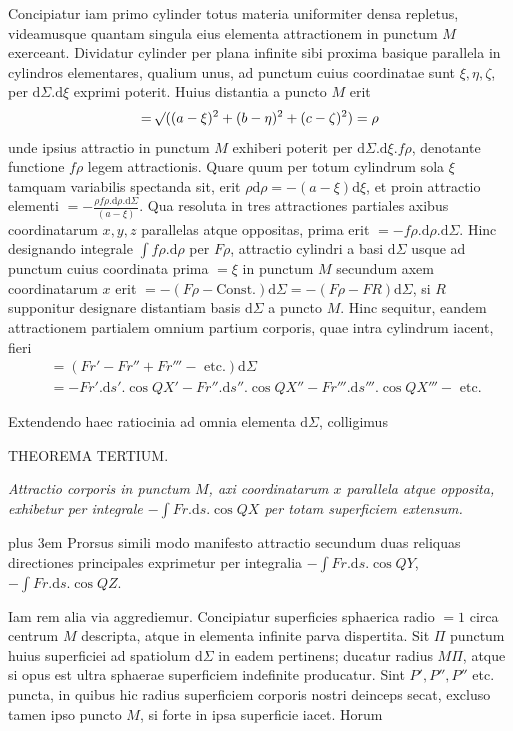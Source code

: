 \par
Concipiatur iam primo cylinder totus materia uniformiter densa repletus, videamusque quantam singula eius elementa attractionem in punctum $M$ exerceant. Dividatur cylinder per plana infinite sibi proxima basique parallela in cylindros elementares, qualium unus, ad punctum cuius coordinatae sunt $\xi,\eta,\zeta$, per $\mathrm{d}\Sigma.\mathrm{d}\xi$ exprimi poterit. Huius distantia a puncto $M$ erit
\[
=\mathord{{}^{}\!\surd}((a-\xi)^2+(b-\eta)^2+(c-\zeta)^2)=\rho
\]
unde ipsius attractio in punctum $M$ exhiberi poterit per $\mathrm{d}\Sigma.\mathrm{d}\xi.f\rho$, denotante functione $f\rho$ legem attractionis. Quare quum per totum cylindrum sola $\xi$ tamquam variabilis spectanda sit, erit $\rho\mathrm{d}\rho=-(a-\xi)\mathrm{d}\xi$, et proin attractio elementi $=-\frac{\rho f\rho.\mathrm{d}\rho.\mathrm{d}\Sigma}{(a-\xi)}$. Qua resoluta in tres attractiones partiales axibus coordinatarum $x,y,z$ parallelas atque oppositas, prima erit $=-f\rho.\mathrm{d}\rho.\mathrm{d}\Sigma$. Hinc designando integrale $\int f\rho.\mathrm{d}\rho$ per $F\rho$, attractio cylindri a basi $\mathrm{d}\Sigma$ usque ad punctum cuius coordinata prima $=\xi$ in punctum $M$ secundum axem coordinatarum $x$ erit $=-(F\rho-\mathrm{Const.})\mathrm{d}\Sigma=-(F\rho-FR)\mathrm{d}\Sigma$, si $R$ supponitur designare distantiam basis $\mathrm{d}\Sigma$ a puncto $M$. Hinc sequitur, eandem attractionem partialem omnium partium corporis, quae intra cylindrum iacent, fieri
\[
\begin{aligned}
&=(Fr'-Fr''+Fr'''-\text{ etc.})\mathrm{d}\Sigma\\
&=-Fr'.\mathrm{d}s'.\cos QX'-Fr''.\mathrm{d}s''.\cos QX''-Fr'''.\mathrm{d}s'''.\cos QX'''-\text{ etc.}
\end{aligned}
\]
\par
Extendendo haec ratiocinia ad omnia elementa $\mathrm{d}\Sigma$, colligimus
\par\medskip{}
\begin{center}THEOREMA TERTIUM.\end{center}
\par
\textit{Attractio corporis in punctum $M$, axi coordinatarum $x$ parallela atque opposita, exhibetur per integrale $-\int Fr.\mathrm{d}s.\cos QX$ per totam superficiem extensum.}
\par
{\rightskip=0pt plus 3em Prorsus simili modo manifesto attractio secundum duas reliquas directiones principales exprimetur per integralia $-\int Fr.\mathrm{d}s.\cos QY$, $-\int Fr.\mathrm{d}s.\cos QZ$.\par}

\par
Iam rem alia via aggrediemur. Concipiatur superficies sphaerica radio $=1$ circa centrum $M$ descripta, atque in elementa infinite parva dispertita. Sit $\Pi$ punctum huius superficiei ad spatiolum $\mathrm{d}\Sigma$ in eadem pertinens; ducatur radius $M\Pi$, atque si opus est ultra sphaerae superficiem indefinite producatur. Sint $P',P'',P''$ etc. puncta, in quibus hic radius superficiem corporis nostri deinceps secat, excluso tamen ipso puncto $M$, si forte in ipsa superficie iacet. Horum
